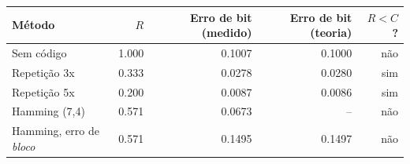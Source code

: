 \begin{tabular}{lrrrr}
\toprule
Método & $R$ & Erro de bit (medido) & Erro de bit (teoria) & $R<C$? \\
\midrule
Sem código & 1.000 & 0.1007 & 0.1000 & não \\
Repetição 3x & 0.333 & 0.0278 & 0.0280 & sim \\
Repetição 5x & 0.200 & 0.0087 & 0.0086 & sim \\
Hamming (7,4) & 0.571 & 0.0673 & -- & não \\
Hamming, erro de \emph{bloco} & 0.571 & 0.1495 & 0.1497 & não \\
\bottomrule
\end{tabular}
